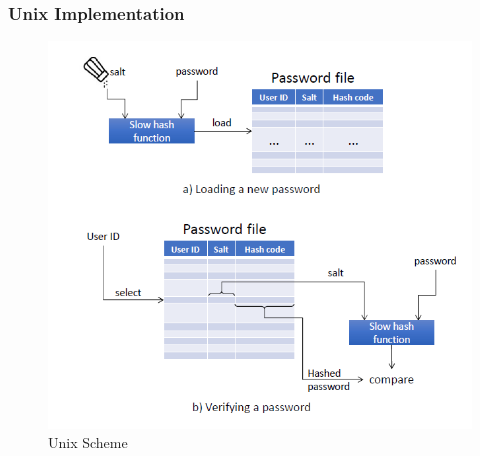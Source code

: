 \documentclass{article}
\begin{document}
        \subsubsection{Unix Implementation}
        \begin{figure}[h]
            \begin{center}
                \includegraphics{../immagini/unix_scheme.png}
            \end{center}
            \caption{Unix Scheme}
        \end{figure}
\end{document}
